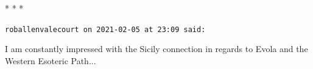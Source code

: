 
\begin{center}* * *\end{center}

\begin{footnotesize}
\begin{sffamily}
\texttt{roballenvalecourt on 2021-02-05 at 23:09 said:}

I am constantly impressed with the Sicily connection in regards to Evola and the Western Esoteric Path... \end{sffamily}
\end{footnotesize}

